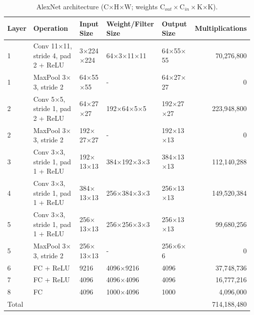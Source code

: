 \begin{table}[htbp]
\centering
\caption{AlexNet architecture (C$\times$H$\times$W; weights C$_{out}\times$C$_{in}\times$K$\times$K).}
\label{tab:alexnet_architecture}
\begin{tabular}{lllllr}
\toprule
\textbf{Layer} & \textbf{Operation} & \textbf{Input Size} & \textbf{Weight/Filter Size} & \textbf{Output Size} & \textbf{Multiplications} \\
\midrule
1 & Conv 11$\times$11, stride 4, pad 2 + ReLU & 3$\times$224$\times$224 & 64$\times$3$\times$11$\times$11 & 64$\times$55$\times$55 & 70{,}276{,}800 \\
1 & MaxPool 3$\times$3, stride 2 & 64$\times$55$\times$55 & - & 64$\times$27$\times$27 & 0 \\
2 & Conv 5$\times$5, stride 1, pad 2 + ReLU & 64$\times$27$\times$27 & 192$\times$64$\times$5$\times$5 & 192$\times$27$\times$27 & 223{,}948{,}800 \\
2 & MaxPool 3$\times$3, stride 2 & 192$\times$27$\times$27 & - & 192$\times$13$\times$13 & 0 \\
3 & Conv 3$\times$3, stride 1, pad 1 + ReLU & 192$\times$13$\times$13 & 384$\times$192$\times$3$\times$3 & 384$\times$13$\times$13 & 112{,}140{,}288 \\
4 & Conv 3$\times$3, stride 1, pad 1 + ReLU & 384$\times$13$\times$13 & 256$\times$384$\times$3$\times$3 & 256$\times$13$\times$13 & 149{,}520{,}384 \\
5 & Conv 3$\times$3, stride 1, pad 1 + ReLU & 256$\times$13$\times$13 & 256$\times$256$\times$3$\times$3 & 256$\times$13$\times$13 & 99{,}680{,}256 \\
5 & MaxPool 3$\times$3, stride 2 & 256$\times$13$\times$13 & - & 256$\times$6$\times$6 & 0 \\
6 & FC + ReLU & 9216 & 4096$\times$9216 & 4096 & 37{,}748{,}736 \\
7 & FC + ReLU & 4096 & 4096$\times$4096 & 4096 & 16{,}777{,}216 \\
8 & FC & 4096 & 1000$\times$4096 & 1000 & 4{,}096{,}000 \\
Total &  &  &  &  & 714{,}188{,}480 \\
\bottomrule
\end{tabular}
\end{table}
